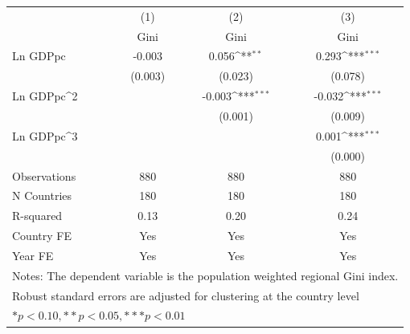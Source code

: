 {
\def\sym#1{\ifmmode^{#1}\else\(^{#1}\)\fi}
\begin{tabular}{l*{3}{c}}
\hline\hline
                    &\multicolumn{1}{c}{(1)}&\multicolumn{1}{c}{(2)}&\multicolumn{1}{c}{(3)}\\
                    &\multicolumn{1}{c}{Gini}&\multicolumn{1}{c}{Gini}&\multicolumn{1}{c}{Gini}\\
\hline
Ln GDPpc            &      -0.003         &       0.056\sym{**} &       0.293\sym{***}\\
                    &     (0.003)         &     (0.023)         &     (0.078)         \\
[1em]
Ln GDPpc^2          &                     &      -0.003\sym{***}&      -0.032\sym{***}\\
                    &                     &     (0.001)         &     (0.009)         \\
[1em]
Ln GDPpc^3          &                     &                     &       0.001\sym{***}\\
                    &                     &                     &     (0.000)         \\
\hline
Observations        &         880         &         880         &         880         \\
N Countries         &         180         &         180         &         180         \\
R-squared           &        0.13         &        0.20         &        0.24         \\
Country FE          &         Yes         &         Yes         &         Yes         \\
Year FE             &         Yes         &         Yes         &         Yes         \\
\hline\hline
\multicolumn{4}{l}{\footnotesize Notes: The dependent variable is the population weighted regional Gini index.}\\
\multicolumn{4}{l}{\footnotesize Robust standard errors are adjusted for clustering at the country level}\\
\multicolumn{4}{l}{\footnotesize $* p<0.10, ** p<0.05, *** p<0.01$}\\
\end{tabular}
}
